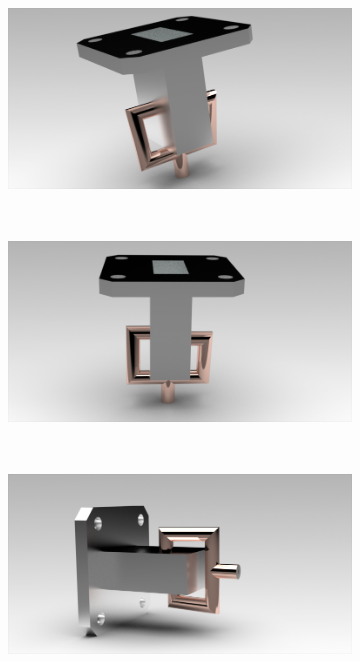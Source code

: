 \documentclass[english,twoside]{article}
\begin{document}
		\newpage
		\begin{figure}[H]
			\centering			
			\begin{subfigure}[b]{0.48\textwidth}
				\includegraphics[width=\textwidth]{renders/coaxToWrTE20_screw}
			\end{subfigure}
			~
			\begin{subfigure}[b]{0.48\textwidth}
				\includegraphics[width=\textwidth]{renders/coaxToWrTE20_screw-2}
			\end{subfigure}
			\vspace{10pt}\newline
			~
			\begin{subfigure}[b]{0.48\textwidth}
				\includegraphics[width=\textwidth]{renders/coaxToWrTE20_screw-3}

\end{subfigure}
\end{figure}
\end{document}
